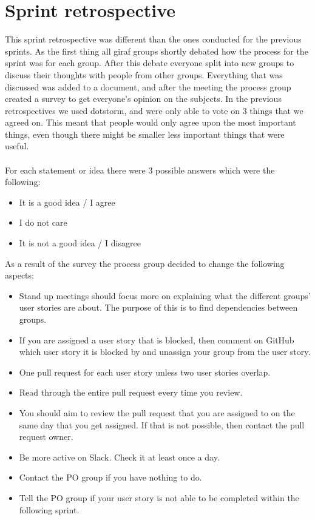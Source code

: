 \section{Sprint retrospective}
This sprint retrospective was different than the ones conducted for the previous sprints.
As the first thing all giraf groups shortly debated how the process for the sprint was for each group.
After this debate everyone split into new groups to discuss their thoughts with people from other groups.
Everything that was discussed was added to a document, and after the meeting the process group created a survey to get everyone's opinion on the subjects.
In the previous retrospectives we used dotstorm, and were only able to vote on 3 things that we agreed on.
This meant that people would only agree upon the most important things, even though there might be smaller less important things that were useful.
\\\\
For each statement or idea there were 3 possible answers which were the following:
\begin{itemize}
    \item It is a good idea / I agree
    \item I do not care
    \item It is not a good idea / I disagree
\end{itemize}
As a result of the survey the process group decided to change the following aspects: 
\begin{itemize}
    \item Stand up meetings should focus more on explaining what the different groups' user stories are about. The purpose of this is to find dependencies between groups.
    \item If you are assigned a user story that is blocked, then comment on GitHub which user story it is blocked by and unassign your group from the user story.
    \item One pull request for each user story unless two user stories overlap.
    \item Read through the entire pull request every time you review.
    \item You should aim to review the pull request that you are assigned to on the same day that you get assigned. If that is not possible, then contact the pull request owner.
    \item Be more active on Slack. Check it at least once a day.
    \item Contact the PO group if you have nothing to do.
    \item Tell the PO group if your user story is not able to be completed within the following sprint.
\end{itemize}
